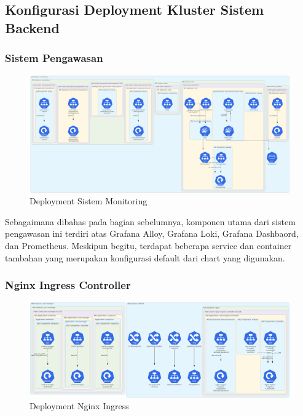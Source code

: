 \subsection{Konfigurasi Deployment Kluster Sistem Backend}

\subsubsection{Sistem Pengawasan}

\begin{figure}[htbp]
    \centering
    \includegraphics[width=1\textwidth]{resources/chapter-4/monitoring.png}
    \caption{Deployment Sistem Monitoring}
    \label{fig:deployment-monitoring}
\end{figure}

Sebagaimana dibahas pada bagian sebelumnya, komponen utama dari sistem pengawasan ini terdiri atas Grafana Alloy, Grafana Loki, Grafana Dashbaord, dan Prometheus. Meskipun begitu, terdapat beberapa service dan container tambahan yang merupakan konfigurasi default dari chart yang digunakan.

\pagebreak

\subsubsection{Nginx Ingress Controller}

\begin{figure}[htbp]
    \centering
    \includegraphics[width=1\textwidth]{resources/chapter-4/nginx.png}
    \caption{Deployment Nginx Ingress}
    \label{fig:deployment-nginx}
\end{figure}

